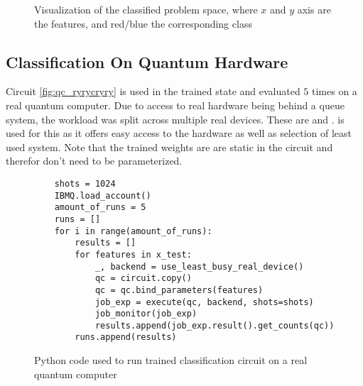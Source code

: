 \begin{figure}
    \centering
    \scalebox{0.75}{
        
    }
    \caption{Visualization of the classified problem space, where $x$ and $y$ axis are the features, and red/blue the corresponding class}
    \label{fig:problem_space_plot}
\end{figure}

\subsection{Classification On Quantum Hardware}
Circuit \ref{fig:qc_ryrycryry} is used in the trained state and evaluated $5$ times on a real quantum computer. Due to access to real hardware being behind a queue system, the workload was split across multiple real devices. These are  and .  is used for this as it offers easy access to the hardware as well as selection of least used system. Note that the trained weights are are static in the circuit and therefor don't need to be parameterized.

\begin{figure}[!ht]
    \centering
    \begin{verbatim}
    shots = 1024
    IBMQ.load_account()
    amount_of_runs = 5
    runs = []
    for i in range(amount_of_runs):
        results = []
        for features in x_test:
            _, backend = use_least_busy_real_device()
            qc = circuit.copy()
            qc = qc.bind_parameters(features)
            job_exp = execute(qc, backend, shots=shots)
            job_monitor(job_exp)
            results.append(job_exp.result().get_counts(qc))
        runs.append(results)
    \end{verbatim}
    \caption{Python code used to run trained classification circuit on a real quantum computer}
    \label{fig:code_real_hardware}
\end{figure}


